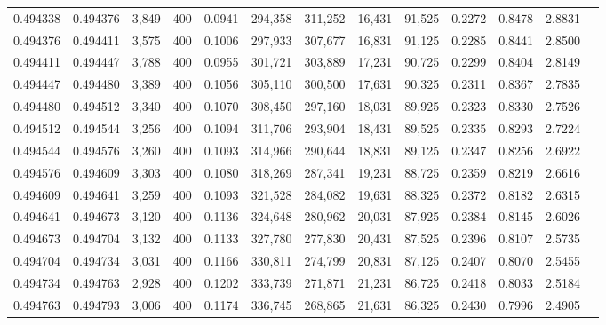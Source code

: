 \begin{tabular}{rrrrrrrrrrrrr}
0.494338 & 0.494376 &  3,849 & 400 &                                     0.0941 & 294,358 & 311,252 &  16,431 &  91,525 & 0.2272 & 0.8478 & 2.8831 \\
0.494376 & 0.494411 &  3,575 & 400 &                                     0.1006 & 297,933 & 307,677 &  16,831 &  91,125 & 0.2285 & 0.8441 & 2.8500 \\
0.494411 & 0.494447 &  3,788 & 400 &                                     0.0955 & 301,721 & 303,889 &  17,231 &  90,725 & 0.2299 & 0.8404 & 2.8149 \\
0.494447 & 0.494480 &  3,389 & 400 &                                     0.1056 & 305,110 & 300,500 &  17,631 &  90,325 & 0.2311 & 0.8367 & 2.7835 \\
0.494480 & 0.494512 &  3,340 & 400 &                                     0.1070 & 308,450 & 297,160 &  18,031 &  89,925 & 0.2323 & 0.8330 & 2.7526 \\
0.494512 & 0.494544 &  3,256 & 400 &                                     0.1094 & 311,706 & 293,904 &  18,431 &  89,525 & 0.2335 & 0.8293 & 2.7224 \\
0.494544 & 0.494576 &  3,260 & 400 &                                     0.1093 & 314,966 & 290,644 &  18,831 &  89,125 & 0.2347 & 0.8256 & 2.6922 \\
0.494576 & 0.494609 &  3,303 & 400 &                                     0.1080 & 318,269 & 287,341 &  19,231 &  88,725 & 0.2359 & 0.8219 & 2.6616 \\
0.494609 & 0.494641 &  3,259 & 400 &                                     0.1093 & 321,528 & 284,082 &  19,631 &  88,325 & 0.2372 & 0.8182 & 2.6315 \\
0.494641 & 0.494673 &  3,120 & 400 &                                     0.1136 & 324,648 & 280,962 &  20,031 &  87,925 & 0.2384 & 0.8145 & 2.6026 \\
0.494673 & 0.494704 &  3,132 & 400 &                                     0.1133 & 327,780 & 277,830 &  20,431 &  87,525 & 0.2396 & 0.8107 & 2.5735 \\
0.494704 & 0.494734 &  3,031 & 400 &                                     0.1166 & 330,811 & 274,799 &  20,831 &  87,125 & 0.2407 & 0.8070 & 2.5455 \\
0.494734 & 0.494763 &  2,928 & 400 &                                     0.1202 & 333,739 & 271,871 &  21,231 &  86,725 & 0.2418 & 0.8033 & 2.5184 \\
0.494763 & 0.494793 &  3,006 & 400 &                                     0.1174 & 336,745 & 268,865 &  21,631 &  86,325 & 0.2430 & 0.7996 & 2.4905 \\

\end{tabular}
